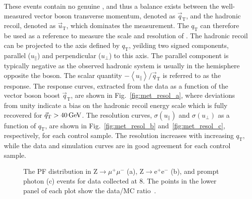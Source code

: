 These events contain no genuine \VEtmiss, and thus a balance exists between the well-measured vector boson transverse momentum, denoted as ${\vec q}_\mathrm{T}$, and the hadronic recoil, denoted as ${\vec u}_\mathrm{T}$,  which dominates the \VEtmiss measurement. The $q_\mathrm{T}$ can therefore be used as a reference to measure the scale and resolution of \VEtmiss.
The hadronic recoil can be projected to the axis defined by $q_\mathrm{T}$, yeilding two signed components, parallel ($u_\parallel$) and perpendicular ($u_\perp$) to this axis. The parallel component is typically negative as the observed hadronic system is usually in the hemisphere opposite the boson. The scalar quantity $-\left\langle u_\parallel\right\rangle/{\vec q}_\mathrm{T}$ is referred to as the \VEtmiss response. The response curves, extracted from the data as a function of the vector boson boost ${\vec q}_\mathrm{T}$, are shown in Fig.~\ref{fig:met_resol_a}, where deviations from unity indicate a bias on the hadronic recoil energy scale which is  fully recovered for ${\vec q}_\mathrm{T} > 40\,\text{Ge\hspace{-.08em}V}$.
The resolution curves, $\sigma(u_\parallel)$ and $\sigma(u_\perp)$ as a function of $q_\mathrm{T}$, are shown in Fig.~\ref{fig:met_resol_b} and~\ref{fig:met_resol_c}, respectively, for each control sample. The resolution increases with increasing $q_\mathrm{T}$, while the data and simulation curves are in good agreement for each control sample.

\begin{figure}[!htb]
\begin{center}
\end{center} 
\caption{The PF \ETmiss distribution in Z$\rightarrow\mu^+\mu^-$ (a), Z$\rightarrow$e$^+$e$^-$ (b), and prompt photon (c) events for data collected at 8\TeV. The points in the lower panel of each plot show the data/MC ratio~\cite{Khachatryan:2014gga}.}
\label{fig:met_distr}
\end{figure}

